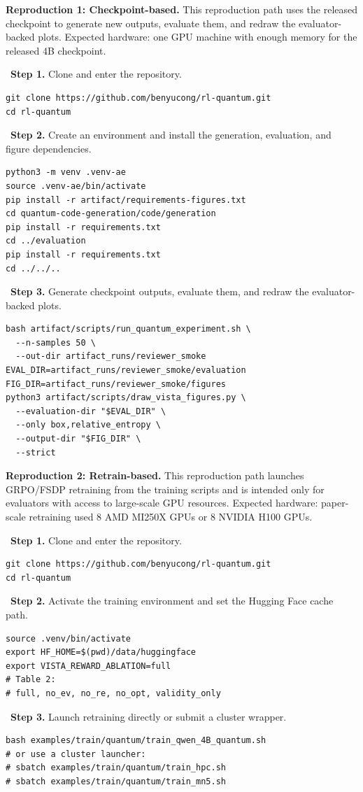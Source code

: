 \documentclass[sigconf,screen,nonacm]{acmart}
\newcommand{\mypar}[1]{\par\noindent\textbf{#1.}}
\newcommand{\taskstep}[2]{\par\noindent\textbullet\ \textbf{Step #1.} #2}
\begin{document}
\mypar{Reproduction 1: Checkpoint-based}
This reproduction path uses the released checkpoint to generate new outputs, evaluate them, and redraw the evaluator-backed plots.
Expected hardware: one GPU machine with enough memory for the released 4B checkpoint.
\taskstep{1}{Clone and enter the repository.}
\begin{verbatim}
git clone https://github.com/benyucong/rl-quantum.git
cd rl-quantum
\end{verbatim}
\taskstep{2}{Create an environment and install the generation, evaluation, and figure dependencies.}
\begin{verbatim}
python3 -m venv .venv-ae
source .venv-ae/bin/activate
pip install -r artifact/requirements-figures.txt
cd quantum-code-generation/code/generation
pip install -r requirements.txt
cd ../evaluation
pip install -r requirements.txt
cd ../../..
\end{verbatim}
\taskstep{3}{Generate checkpoint outputs, evaluate them, and redraw the evaluator-backed plots.}
\begin{verbatim}
bash artifact/scripts/run_quantum_experiment.sh \
  --n-samples 50 \
  --out-dir artifact_runs/reviewer_smoke
EVAL_DIR=artifact_runs/reviewer_smoke/evaluation
FIG_DIR=artifact_runs/reviewer_smoke/figures
python3 artifact/scripts/draw_vista_figures.py \
  --evaluation-dir "$EVAL_DIR" \
  --only box,relative_entropy \
  --output-dir "$FIG_DIR" \
  --strict
\end{verbatim}

\mypar{Reproduction 2: Retrain-based}
This reproduction path launches GRPO/FSDP retraining from the training scripts and is intended only for evaluators with access to large-scale GPU resources.
Expected hardware: paper-scale retraining used 8 AMD MI250X GPUs or 8 NVIDIA H100 GPUs.
\taskstep{1}{Clone and enter the repository.}
\begin{verbatim}
git clone https://github.com/benyucong/rl-quantum.git
cd rl-quantum
\end{verbatim}
\taskstep{2}{Activate the training environment and set the Hugging Face cache path.}
\begin{verbatim}
source .venv/bin/activate
export HF_HOME=$(pwd)/data/huggingface
export VISTA_REWARD_ABLATION=full
# Table 2:
# full, no_ev, no_re, no_opt, validity_only
\end{verbatim}
\taskstep{3}{Launch retraining directly or submit a cluster wrapper.}
\begin{verbatim}
bash examples/train/quantum/train_qwen_4B_quantum.sh
# or use a cluster launcher:
# sbatch examples/train/quantum/train_hpc.sh
# sbatch examples/train/quantum/train_mn5.sh
\end{verbatim}
\end{document}
